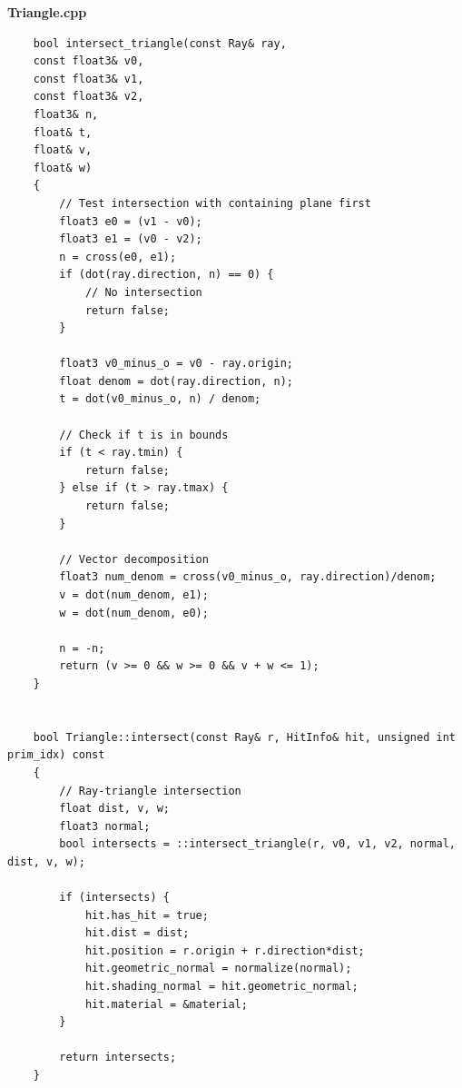 \documentclass[a4,12pt]{article}
\begin{document}
	\textbf{Triangle.cpp}
	\begin{lstlisting}
	bool intersect_triangle(const Ray& ray,
	const float3& v0,
	const float3& v1,
	const float3& v2,
	float3& n,
	float& t,
	float& v,
	float& w)
	{		
		// Test intersection with containing plane first
		float3 e0 = (v1 - v0);
		float3 e1 = (v0 - v2);
		n = cross(e0, e1);
		if (dot(ray.direction, n) == 0) {
			// No intersection
			return false;
		}
		
		float3 v0_minus_o = v0 - ray.origin;
		float denom = dot(ray.direction, n);
		t = dot(v0_minus_o, n) / denom;
		
		// Check if t is in bounds
		if (t < ray.tmin) {
			return false;
		} else if (t > ray.tmax) {
			return false;
		}
		
		// Vector decomposition
		float3 num_denom = cross(v0_minus_o, ray.direction)/denom;
		v = dot(num_denom, e1);
		w = dot(num_denom, e0);
		
		n = -n;
		return (v >= 0 && w >= 0 && v + w <= 1);
	}
	
	
	bool Triangle::intersect(const Ray& r, HitInfo& hit, unsigned int prim_idx) const
	{
		// Ray-triangle intersection
		float dist, v, w;
		float3 normal;
		bool intersects = ::intersect_triangle(r, v0, v1, v2, normal, dist, v, w);
		
		if (intersects) {
			hit.has_hit = true;
			hit.dist = dist;
			hit.position = r.origin + r.direction*dist;
			hit.geometric_normal = normalize(normal);
			hit.shading_normal = hit.geometric_normal;
			hit.material = &material;
		}
		
		return intersects;
	}
	\end{lstlisting}
	
\end{document}
